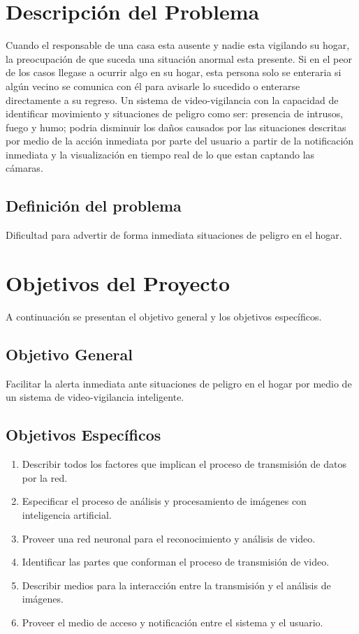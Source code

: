 \section{Descripción del Problema}
Cuando el responsable de una casa esta ausente y nadie esta vigilando su hogar, la preocupación de que suceda una situación anormal esta presente. Si en el peor de los casos llegase a ocurrir algo en su hogar, esta persona solo se enteraria si algún vecino se comunica con él para avisarle lo sucedido o enterarse directamente a su regreso. Un sistema de video-vigilancia con la capacidad de identificar movimiento y situaciones de peligro como ser: presencia de intrusos, fuego y humo; podria disminuir los daños causados por las situaciones descritas por medio de la acción inmediata por parte del usuario a partir de la notificación inmediata y la visualización en tiempo real de lo que estan captando las cámaras.\

\subsection{Definición del problema}
Dificultad para advertir de forma inmediata situaciones de peligro en el hogar.

\section{Objetivos del Proyecto}
A continuación se presentan el objetivo general y los objetivos específicos.

\subsection{Objetivo General}
Facilitar la alerta inmediata ante situaciones de peligro en el hogar por medio de un sistema de video-vigilancia inteligente.

\subsection{Objetivos Específicos}
\begin{enumerate}
    \item Describir todos los factores que implican el proceso de transmisión de datos por la red.
    \item Especificar el proceso de análisis y procesamiento de imágenes con inteligencia artificial.
    \item Proveer una red neuronal para el reconocimiento y análisis de video.
    \item Identificar las partes que conforman el proceso de transmisión de video.
    \item Describir medios para la interacción entre la transmisión y el análisis de imágenes.
    \item Proveer el medio de acceso y notificación entre el sistema y el usuario.
\end{enumerate}

